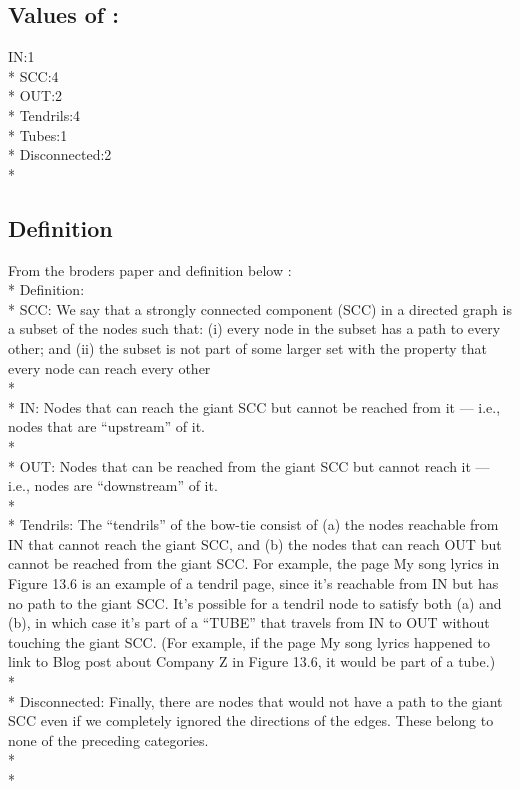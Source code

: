 \documentclass[12pt]{article}
\begin{document}
\subsection{Values of :}
IN:1\\*
SCC:4\\*
OUT:2\\*
Tendrils:4\\*
Tubes:1\\*
Disconnected:2\\*
\newpage
\subsection{Definition}
From the broders paper and definition below :\\*
Definition:\\*
SCC: We say that a strongly connected component (SCC) in a directed graph is a
subset of the nodes such that: (i) every node in the subset has a path to every
other; and (ii) the subset is not part of some larger set with the property that
every node can reach every other
\\*\\*
IN: Nodes that can reach the giant SCC but cannot be reached from it — i.e., nodes
that are “upstream” of it.
\\*\\*
OUT: Nodes that can be reached from the giant SCC but cannot reach it — i.e., nodes
are “downstream” of it.
\\*\\*
Tendrils: The “tendrils” of the bow-tie consist of (a) the nodes reachable from IN that
cannot reach the giant SCC, and (b) the nodes that can reach OUT but cannot be
reached from the giant SCC. For example, the page My song lyrics in Figure 13.6 is
an example of a tendril page, since it’s reachable from IN but has no path to the giant
SCC. It’s possible for a tendril node to satisfy both (a) and (b), in which case it’s
part of a “TUBE” that travels from IN to OUT without touching the giant SCC. (For
example, if the page My song lyrics happened to link to Blog post about Company Z in
Figure 13.6, it would be part of a tube.)
\\*\\*
Disconnected: Finally, there are nodes that would not have a path to the giant SCC
even if we completely ignored the directions of the edges. These belong to none of the
preceding categories.
\\*\\*
\end{document}
